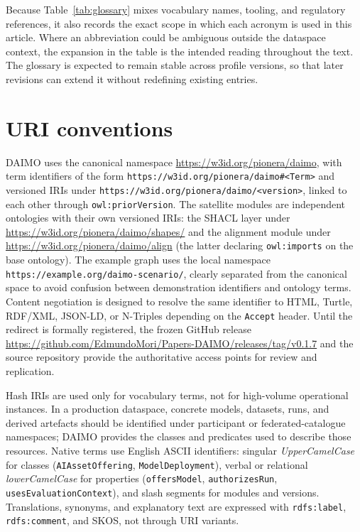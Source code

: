 \documentclass[Afour,sagev,times]{sagej}
\newcommand{\code}[1]{\texttt{#1}}
\begin{document}
Because Table~\ref{tab:glossary} mixes vocabulary names, tooling, and regulatory references, it also records the exact scope in which each acronym is used in this article. Where an abbreviation could be ambiguous outside the dataspace context, the expansion in the table is the intended reading throughout the text. The glossary is expected to remain stable across profile versions, so that later revisions can extend it without redefining existing entries.

\section{URI conventions}\label{app:uris}

DAIMO uses the canonical namespace \url{https://w3id.org/pionera/daimo}, with term identifiers of the form \code{https://w3id.org/pionera/daimo\#<Term>} and versioned IRIs under \code{https://w3id.org/pionera/daimo/<version>}, linked to each other through \code{owl:priorVersion}. The satellite modules are independent ontologies with their own versioned IRIs: the SHACL layer under \url{https://w3id.org/pionera/daimo/shapes/} and the alignment module under \url{https://w3id.org/pionera/daimo/align} (the latter declaring \code{owl:imports} on the base ontology). The example graph uses the local namespace \code{https://example.org/daimo-scenario/}, clearly separated from the canonical space to avoid confusion between demonstration identifiers and ontology terms. Content negotiation is designed to resolve the same identifier to HTML, Turtle, RDF/XML, JSON-LD, or N-Triples depending on the \code{Accept} header. Until the redirect is formally registered, the frozen GitHub release \url{https://github.com/EdmundoMori/Papers-DAIMO/releases/tag/v0.1.7} and the source repository provide the authoritative access points for review and replication.

Hash IRIs are used only for vocabulary terms, not for high-volume operational instances. In a production dataspace, concrete models, datasets, runs, and derived artefacts should be identified under participant or federated-catalogue namespaces; DAIMO provides the classes and predicates used to describe those resources. Native terms use English ASCII identifiers: singular \emph{UpperCamelCase} for classes (\code{AIAssetOffering}, \code{ModelDeployment}), verbal or relational \emph{lowerCamelCase} for properties (\code{offersModel}, \code{authorizesRun}, \code{usesEvaluationContext}), and slash segments for modules and versions. Translations, synonyms, and explanatory text are expressed with \code{rdfs:label}, \code{rdfs:comment}, and SKOS, not through URI variants.
\end{document}
